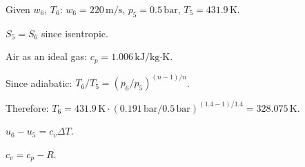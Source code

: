 Given \( w_6 \), \( T_6 \):  
\( w_6 = 220 \, \text{m/s} \), \( p_5 = 0.5 \, \text{bar} \), \( T_5 = 431.9 \, \text{K} \).  

\( S_5 = S_6 \) since isentropic.  

Air as an ideal gas:  
\( c_p = 1.006 \, \text{kJ/kg·K} \).  

Since adiabatic:  
\( T_6 / T_5 = (p_6 / p_5)^{(n-1)/n} \).  

Therefore:  
\( T_6 = 431.9 \, \text{K} \cdot (0.191 \, \text{bar} / 0.5 \, \text{bar})^{(1.4-1)/1.4} = 328.075 \, \text{K} \).  

\( u_6 - u_5 = c_v \Delta T \).  

\( c_v = c_p - R \).